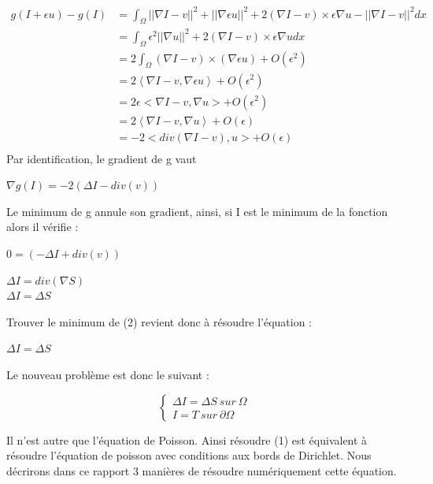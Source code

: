 \begin{equation*} 
\left.
\begin{aligned}
    g(I+\epsilon u) -g(I) &=  \int_\Omega || \nabla I - v||^2+ ||\nabla \epsilon u||^2 +2(\nabla I - v)\times \epsilon \nabla u  - ||\nabla I -v ||^2 dx\\
  &=  \int_\Omega \epsilon ^2||\nabla u||^2 +2(\nabla I - v)\times \epsilon \nabla u dx\\
    & = 2\int_\Omega (\nabla I - v) \times (\nabla \epsilon u ) + O (\epsilon^2) \\ 
    & = 2\left<\nabla I - v, \nabla \epsilon u \right> + O (\epsilon^2) \\ 
      &  =   2\epsilon<\nabla I - v,  \nabla u> + O (\epsilon^2) \\ 
         &  = 2\left<\nabla I - v,  \nabla u \right> + O (\epsilon)\\ 
    & =  -2 <div(\nabla I - v), u > + O (\epsilon)\\
\end{aligned}
\right.
\end{equation*}
Par identification, le gradient de g vaut 
\begin{center}
		$\nabla g(I) = -2(\Delta I-div( v))$
\end{center} 
Le minimum de g annule son gradient, ainsi, si I est le minimum de la fonction alors il vérifie :
\begin{center}
		$0= (-\Delta I+div(v))$
\end{center}
\begin{center}
		$\Delta I =div(\nabla S)$\\
		$\Delta I = \Delta S$
		
\end{center} 

Trouver le minimum de (2) revient donc à résoudre l'équation : 
\begin{center}
$\Delta I = \Delta S$
\end{center}
Le nouveau problème est donc le suivant : 
\begin{center}
    \begin{equation}
        \left\{
        \begin{aligned}
         \Delta I = \Delta S  \ sur \  \Omega \\
          I = T \ sur \  \partial \Omega
        \end{aligned}
        \right.
    \end{equation}
\end{center}
Il n'est autre que l'équation de Poisson. Ainsi résoudre (1) est équivalent à résoudre l'équation de poisson avec conditions aux bords de Dirichlet. Nous décrirons dans ce rapport 3 manières de résoudre numériquement cette équation.

